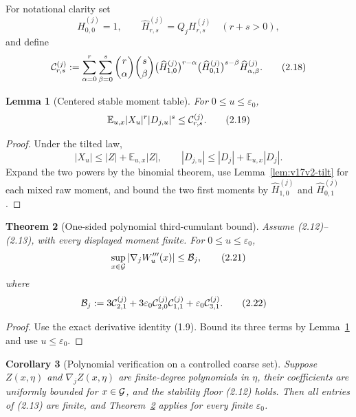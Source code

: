 \documentclass[11pt]{article}
\newtheorem{theorem}{Theorem}[section]
\newtheorem{lemma}[theorem]{Lemma}
\newtheorem{corollary}[theorem]{Corollary}
\theoremstyle{remark}
\begin{document}
For notational clarity set
\[
 \widehat H_{0,0}^{(j)}=1,\qquad
 \widehat H_{r,s}^{(j)}
 =Q_jH_{r,s}^{(j)}
 \quad(r+s>0),                                      \tag{2.17}
\]
and define
\[
\begin{split}
 {\cal C}_{r,s}^{(j)}
 :=
 \sum_{\alpha=0}^r\sum_{\beta=0}^s
 \binom r\alpha\binom s\beta
 \bigl(\widehat H_{1,0}^{(j)}\bigr)^{r-\alpha}
 \bigl(\widehat H_{0,1}^{(j)}\bigr)^{s-\beta}
 \widehat H_{\alpha,\beta}^{(j)}.                  \tag{2.18}
\end{split}
\]

\begin{lemma}[Centered stable moment table]
\label{lem:v17v2-centered}
For \(0\leq u\leq\varepsilon_0\),
\[
 {\mathbb E}_{u,x}
 |X_u|^r|D_{j,u}|^s
 \leq{\cal C}_{r,s}^{(j)}.                          \tag{2.19}
\]
\end{lemma}

\begin{proof}
Under the tilted law,
\[
 |X_u|
 \leq|Z|+{\mathbb E}_{u,x}|Z|,
 \qquad
 |D_{j,u}|
 \leq|D_j|+{\mathbb E}_{u,x}|D_j|.                 \tag{2.20}
\]
Expand the two powers by the binomial theorem, use
Lemma~\ref{lem:v17v2-tilt} for each mixed raw moment, and bound the
two first moments by
\(\widehat H_{1,0}^{(j)}\) and
\(\widehat H_{0,1}^{(j)}\).
\end{proof}

\begin{theorem}[One-sided polynomial third-cumulant bound]
\label{thm:v17v2-one-sided}
Assume (2.12)--(2.13), with every displayed moment finite.  For
\(0\leq u\leq\varepsilon_0\),
\[
 \sup_{x\in{\cal G}}|\nabla_jW'''_u(x)|
 \leq{\cal B}_j,                                   \tag{2.21}
\]
where
\[
\begin{split}
 {\cal B}_j:={}&
 3{\cal C}_{2,1}^{(j)}
 +3\varepsilon_0
 {\cal C}_{2,0}^{(j)}{\cal C}_{1,1}^{(j)}
 +\varepsilon_0{\cal C}_{3,1}^{(j)}.               \tag{2.22}
\end{split}
\]
\end{theorem}

\begin{proof}
Use the exact derivative identity (1.9).  Bound its three terms by
Lemma~\ref{lem:v17v2-centered} and use
\(u\leq\varepsilon_0\).
\end{proof}

\begin{corollary}[Polynomial verification on a controlled coarse
set]
\label{cor:v17v2-polynomial}
Suppose \(Z(x,\eta)\) and \(\nabla_jZ(x,\eta)\) are finite-degree
polynomials in \(\eta\), their coefficients are uniformly bounded
for \(x\in{\cal G}\), and the stability floor (2.12) holds.  Then all
entries of (2.13) are finite, and
Theorem~\ref{thm:v17v2-one-sided} applies for every finite
\(\varepsilon_0\).
\end{corollary}
\end{document}

